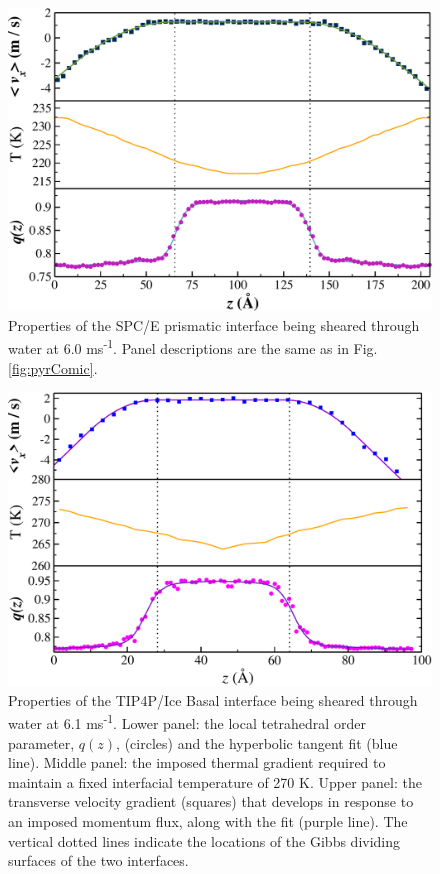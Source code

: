\begin{figure}
\includegraphics[width=\linewidth]{Figures/Pri_comic_strip}
\caption{\label{fig:pComic} Properties of the SPC/E prismatic interface
  being sheared through water at 6.0 ms\textsuperscript{-1}.  Panel
  descriptions are the same as in Fig. \ref{fig:pyrComic}.}
\end{figure}

\begin{figure}
\includegraphics[width=\linewidth]{Figures/Basal_TIP4PIce_Plot}
\caption{\label{fig:tipbComic} Properties of the TIP4P/Ice Basal
  interface being sheared through water at 6.1
  ms\textsuperscript{-1}. Lower panel: the local tetrahedral order
  parameter, $q(z)$, (circles) and the hyperbolic tangent fit
  (blue line).  Middle panel: the imposed thermal gradient
  required to maintain a fixed interfacial temperature of 270 K. Upper
  panel: the transverse velocity gradient (squares) that develops in
  response to an imposed momentum flux, along with the fit (purple
  line). The vertical dotted lines indicate the locations of the Gibbs
  dividing surfaces of the two interfaces.}
\end{figure}

